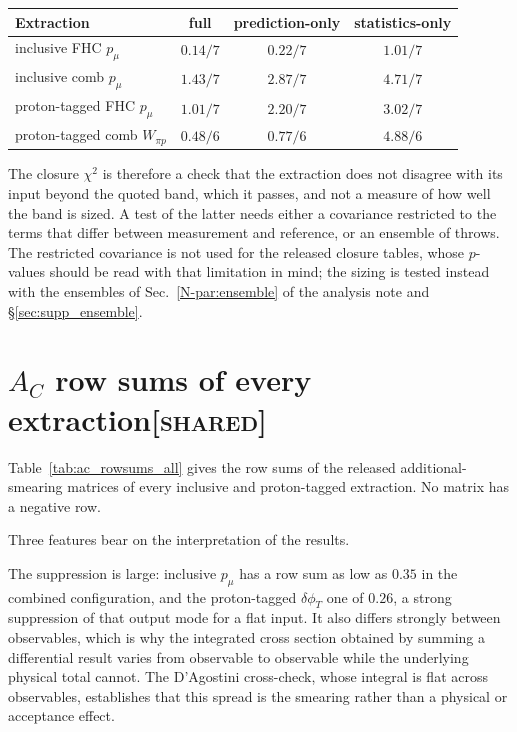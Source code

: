 \documentclass[11pt,a4paper]{article}
\newcommand{\noteref}[2]{#1~\ref{N-#2} of the analysis note}
\newcommand{\scopetag}[1]{\hfill{\normalfont\small\textsc{[#1]}}}
\begin{document}
\begin{center}
\small
\begin{tabular}{lccc}
\toprule
Extraction & full & prediction-only & statistics-only \\
\midrule
inclusive FHC $p_\mu$        & $0.14/7$ & $0.22/7$ & $1.01/7$ \\
inclusive comb $p_\mu$       & $1.43/7$ & $2.87/7$ & $4.71/7$ \\
proton-tagged FHC $p_\mu$    & $1.01/7$ & $2.20/7$ & $3.02/7$ \\
proton-tagged comb $W_{\pi p}$ & $0.48/6$ & $0.77/6$ & $4.88/6$ \\
\bottomrule
\end{tabular}
\end{center}

The closure $\chi^2$ is therefore a check that the extraction does not disagree
with its input beyond the quoted band, which it passes, and not a measure of how well the
band is sized.  A test of the latter needs either a covariance restricted to the terms that differ
between measurement and reference, or an ensemble of throws. The restricted covariance is
not used for the released closure tables, whose $p$-values should be read with that
limitation in mind; the sizing is tested instead with the ensembles of
\noteref{Sec.}{par:ensemble} and \S\ref{sec:supp_ensemble}.

\section[$A_C$ row sums of every extraction]{$A_C$ row sums of every extraction\scopetag{shared}}
\label{sec:supp_ac}

Table~\ref{tab:ac_rowsums_all} gives the row sums of the released additional-smearing
matrices of every inclusive and proton-tagged extraction. No matrix has a negative row.



Three features bear on the interpretation of the results.

The suppression is large: inclusive $p_\mu$ has a row sum as low as $0.35$ in
the combined configuration, and the proton-tagged $\delta\phi_T$ one of $0.26$, a strong suppression of that output mode
for a flat input.  It also differs strongly between observables, which is
why the integrated cross section obtained by summing a differential result
varies from observable to observable while the underlying physical total cannot.  The
D'Agostini cross-check, whose integral is flat across observables, establishes
that this spread is the smearing rather than a physical or acceptance effect.
\end{document}
